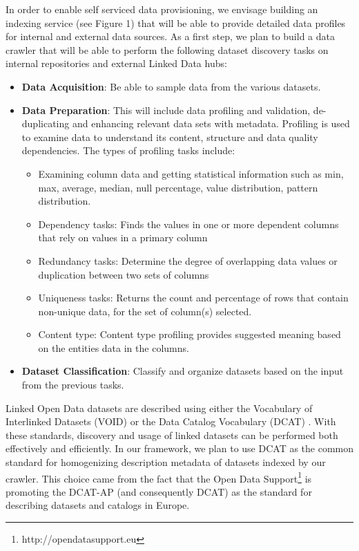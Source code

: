 \documentclass[onecolumn, crcready]{iosart2c}
\begin{document}
In order to enable self serviced data provisioning, we envisage building an indexing service (see Figure 1) that will be able to provide detailed data profiles for internal and external data sources. As a first step, we plan to build a data crawler that will be able to perform the following dataset discovery tasks on internal repositories and external Linked Data hubs:
 \begin{itemize}
 \item {\bf Data Acquisition}: Be able to sample data from the various datasets.
 \item {\bf Data Preparation}: This will include data profiling and validation, de-duplicating and enhancing relevant data sets with metadata. Profiling is used to examine data to understand its content, structure and data quality dependencies. The types of profiling tasks include:
 \begin{itemize}
 \item Examining column data and getting statistical information such as min, max, average, median, null percentage, value distribution, pattern distribution.
 \item Dependency tasks: Finds the values in one or more dependent columns that rely on values in a primary column
 \item Redundancy tasks: Determine the degree of overlapping data values or duplication between two sets of columns
 \item Uniqueness tasks: Returns the count and percentage of rows that contain non-unique data, for the set of column(s) selected.
 \item Content type: Content type profiling provides suggested meaning based on the entities data in the columns.
 \end{itemize}
 \item {\bf Dataset Classification}: Classify and organize datasets based on the input from the previous tasks.
\end{itemize}

Linked Open Data datasets are described using either the Vocabulary of Interlinked Datasets (VOID) \cite{Cyganiak:11:DLD} or the Data Catalog Vocabulary (DCAT) \cite{Maali:13:DCV}. With these standards, discovery and usage of linked datasets can be performed both effectively and efficiently. In our framework, we plan to use DCAT as the common standard for homogenizing description metadata of datasets indexed by our crawler. This choice came from the fact that the Open Data Support\footnote{http://opendatasupport.eu} is promoting the DCAT-AP (and consequently DCAT) as the standard for describing datasets and catalogs in Europe.
\end{document}
